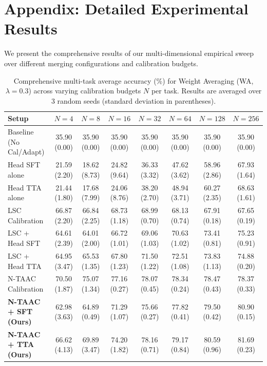 \documentclass{article}
\theoremstyle{plain}
\theoremstyle{definition}
\theoremstyle{remark}
\begin{document}



\newpage
\appendix
\onecolumn
\section{Appendix: Detailed Experimental Results}
We present the comprehensive results of our multi-dimensional empirical sweep over different merging configurations and calibration budgets. 

\begin{table}[ht]
\centering
\caption{Comprehensive multi-task average accuracy (\%) for Weight Averaging (WA, $\lambda=0.3$) across varying calibration budgets $N$ per task. Results are averaged over 3 random seeds (standard deviation in parentheses).}
\label{tab:appendix_wa_03}
\vskip 0.15in
\begin{sc}
\begin{scriptsize}
\setlength{\tabcolsep}{3pt}
\begin{tabular}{lccccccc}
\toprule
Setup & $N=4$ & $N=8$ & $N=16$ & $N=32$ & $N=64$ & $N=128$ & $N=256$ \\
\midrule
Baseline (No Cal/Adapt) & 35.90 (0.00) & 35.90 (0.00) & 35.90 (0.00) & 35.90 (0.00) & 35.90 (0.00) & 35.90 (0.00) & 35.90 (0.00) \\
Head SFT alone & 21.59 (2.20) & 18.62 (8.73) & 24.82 (9.64) & 36.33 (3.32) & 47.62 (3.62) & 58.96 (2.86) & 67.93 (1.64) \\
Head TTA alone & 21.44 (1.80) & 17.68 (7.99) & 24.06 (8.76) & 38.20 (2.70) & 48.94 (3.71) & 60.27 (2.35) & 68.63 (1.61) \\
LSC Calibration & 66.87 (2.20) & 66.84 (2.25) & 68.73 (1.18) & 68.99 (0.70) & 68.13 (0.74) & 67.91 (0.18) & 67.65 (0.19) \\
LSC + Head SFT & 64.61 (2.39) & 64.01 (2.00) & 66.72 (1.01) & 69.06 (1.03) & 70.63 (1.02) & 73.41 (0.81) & 75.23 (0.91) \\
LSC + Head TTA & 64.95 (3.47) & 65.53 (1.35) & 67.80 (1.23) & 71.50 (1.22) & 72.51 (1.08) & 73.83 (1.13) & 74.88 (0.20) \\
N-TAAC Calibration & 70.50 (1.87) & 75.07 (1.34) & 77.16 (0.27) & 78.07 (0.45) & 78.34 (0.24) & 78.47 (0.43) & 78.37 (0.33) \\
\textbf{N-TAAC + SFT (Ours)} & 62.98 (3.63) & 64.89 (0.49) & 71.29 (1.07) & 75.66 (0.27) & 77.82 (0.41) & 79.50 (0.42) & 80.90 (0.15) \\
\textbf{N-TAAC + TTA (Ours)} & 66.62 (4.13) & 69.89 (3.47) & 74.20 (1.82) & 78.16 (0.71) & 79.17 (0.84) & 80.59 (0.96) & 81.69 (0.23) \\
\bottomrule
\end{tabular}
\end{scriptsize}
\end{sc}
\end{table}
\end{document}
